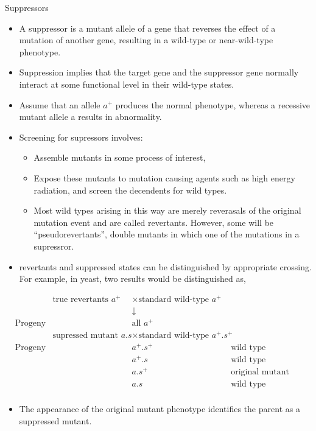 \documentclass[11pt,dvipsnames,ignorenonframetext,aspectratio=169]{beamer}
\providecommand{\tightlist}{%
  \setlength{\itemsep}{0pt}\setlength{\parskip}{0pt}}
\begin{document}
\begin{frame}{Suppressors}
\protect\hypertarget{suppressors}{}
\begin{itemize}
\tightlist
\item
  A suppressor is a mutant allele of a gene that reverses the effect of
  a mutation of another gene, resulting in a wild-type or near-wild-type
  phenotype.
\item
  Suppression implies that the target gene and the suppressor gene
  normally interact at some functional level in their wild-type states.
\item
  Assume that an allele \(a^+\) produces the normal phenotype, whereas a
  recessive mutant allele a results in abnormality.
\item
  Screening for supressors involves:

  \begin{itemize}
  \tightlist
  \item
    Assemble mutants in some process of interest,
  \item
    Expose these mutants to mutation causing agents such as high energy
    radiation, and screen the decendents for wild types.
  \item
    Most wild types arising in this way are merely reverasals of the
    original mutation event and are called revertants. However, some
    will be ``pseudorevertants'', double mutants in which one of the
    mutations in a supressror.
  \end{itemize}
\end{itemize}
\end{frame}

\begin{frame}{}
\protect\hypertarget{section-20}{}
\begin{itemize}
\tightlist
\item
  revertants and suppressed states can be distinguished by appropriate
  crossing. For example, in yeast, two results would be distinguished
  as,
\end{itemize}

\[
\begin{aligned}
&& \textrm{true revertants }a^+ &\times \textrm{standard wild-type }a^+ & \\
&&& \downarrow & \\
& \textrm{Progeny} && \textrm{all } a^+ & \\
&& \textrm{supressed mutant } a.s &\times \textrm{standard wild-type } a^+.s^+ & \\
& \textrm{Progeny} && a^+. s^+ & \textrm{wild type} & \\
& && a^+. s & \textrm{wild type} & \\
& && a. s^+ & \textrm{original mutant} & \\
& && a. s & \textrm{wild type (supressed)} & \\
\end{aligned}
\]

\begin{itemize}
\tightlist
\item
  The appearance of the original mutant phenotype identifies the parent
  as a suppressed mutant.
\end{itemize}
\end{frame}
\end{document}
